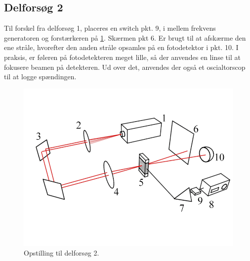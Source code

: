 \documentclass[main]{subfiles}
\begin{document}
\subsection{Delforsøg 2}
Til forskel fra delforsøg 1, placeres en switch pkt. 9, i mellem frekvens generatoren og forstærkeren på \cref{fig:opstilling2}. Skærmen pkt 6. Er brugt til at afskærme den ene stråle, hvorefter den anden stråle opsamles på en fotodetektor i pkt. 10. I praksis, er føleren på fotodetekteren meget lille, så der anvendes en linse til at fokusere beamen på detekteren. Ud over det, anvendes der også et oscialtorscop til at logge spændingen.
\begin{figure}[H]
    \centering
    \includegraphics[width=\linewidth]{tegninger/tegning2.png}
    \caption{Opstilling til delforsøg 2.}
    \label{fig:opstilling2}
\end{figure}
\end{document}
